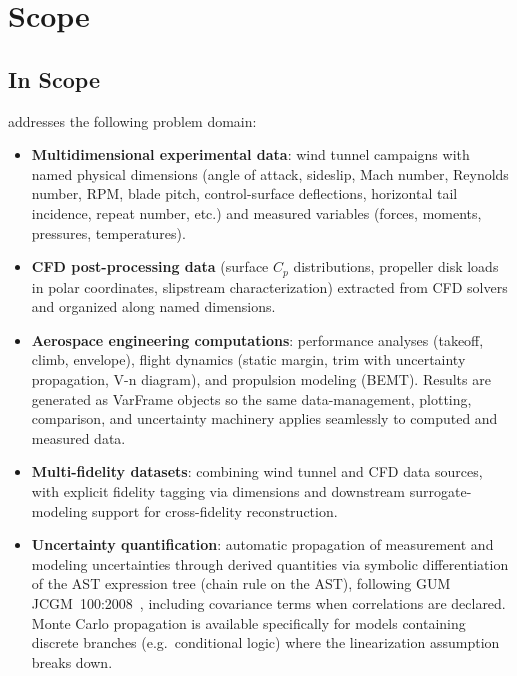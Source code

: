 
\chapter{Scope}
\label{ch:scope}

\section{In Scope}

\itc{} addresses the following problem domain:

\begin{itemize}
  \item \textbf{Multidimensional experimental data}: wind tunnel
    campaigns with named physical dimensions (angle of attack, sideslip,
    Mach number, Reynolds number, RPM, blade pitch, control-surface
    deflections, horizontal tail incidence, repeat number, etc.) and
    measured variables (forces, moments, pressures, temperatures).

  \item \textbf{CFD post-processing data} (surface $C_p$ distributions, propeller disk loads in polar coordinates, slipstream characterization) extracted from CFD solvers and organized along named dimensions.

  \item \textbf{Aerospace engineering computations}: performance analyses
    (takeoff, climb, envelope), flight dynamics (static margin, trim with
    uncertainty propagation, V-n diagram), and propulsion modeling
    (BEMT). Results are generated as VarFrame objects so the same
    data-management, plotting, comparison, and uncertainty machinery
    applies seamlessly to computed and measured data.

  \item \textbf{Multi-fidelity datasets}: combining wind tunnel and CFD
    data sources, with explicit fidelity tagging via dimensions and
    downstream surrogate-modeling support for cross-fidelity reconstruction.

  \item \textbf{Uncertainty quantification}: automatic propagation of
    measurement and modeling uncertainties through derived quantities via
    symbolic differentiation of the AST expression tree (chain rule on the
    AST), following GUM JCGM~100:2008~\citep{gum2008}, including covariance
    terms when correlations are declared. Monte Carlo propagation is
    available specifically for models containing discrete branches (e.g.\
    conditional logic) where the linearization assumption breaks down.


\end{itemize}

